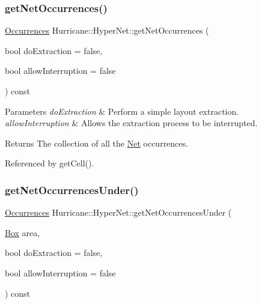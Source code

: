 \subsubsection{\texorpdfstring{get\+Net\+Occurrences()}{getNetOccurrences()}}
{\footnotesize\ttfamily \hyperlink{namespaceHurricane_a1912927c128eee859af62dbe4cbe0a6b}{Occurrences} Hurricane\+::\+Hyper\+Net\+::get\+Net\+Occurrences (\begin{DoxyParamCaption}\item[{bool}]{do\+Extraction = {\ttfamily false},  }\item[{bool}]{allow\+Interruption = {\ttfamily false} }\end{DoxyParamCaption}) const}


\begin{DoxyParams}{Parameters}
{\em do\+Extraction} & Perform a simple layout extraction. \\
\hline
{\em allow\+Interruption} & Allows the extraction process to be interrupted. \\
\hline
\end{DoxyParams}
\begin{DoxyReturn}{Returns}
The collection of all the \hyperlink{classHurricane_1_1Net}{Net} occurrences. 
\end{DoxyReturn}


Referenced by get\+Cell().

\mbox{\label{classHurricane_1_1HyperNet_ab278267a5f1d91bd22bc7fe411b3cfb0}} 
\subsubsection{\texorpdfstring{get\+Net\+Occurrences\+Under()}{getNetOccurrencesUnder()}}
{\footnotesize\ttfamily \hyperlink{namespaceHurricane_a1912927c128eee859af62dbe4cbe0a6b}{Occurrences} Hurricane\+::\+Hyper\+Net\+::get\+Net\+Occurrences\+Under (\begin{DoxyParamCaption}\item[{\hyperlink{classHurricane_1_1Box}{Box}}]{area,  }\item[{bool}]{do\+Extraction = {\ttfamily false},  }\item[{bool}]{allow\+Interruption = {\ttfamily false} }\end{DoxyParamCaption}) const}


